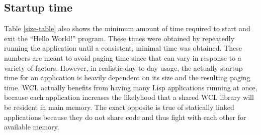 \subsection{Startup time}

Table \ref{size-table} also shows the minimum amount of time required to
start and exit the ``Hello World!'' program. These times were obtained
by repeatedly running the application until a consistent, minimal time
was obtained. These numbers are meant to avoid paging time since
that can vary in response to a variety of factors. However, in
realistic day to day usage, the actually startup time for an
application is heavily dependent on its size and the resulting paging
time. WCL actually benefits from having many Lisp applications running
at once, because each application increases the likelyhood that 
a shared WCL library will be resident in main memory. The exact opposite
is true of statically linked applications because they do not
share code and thus fight with each other for available memory.


